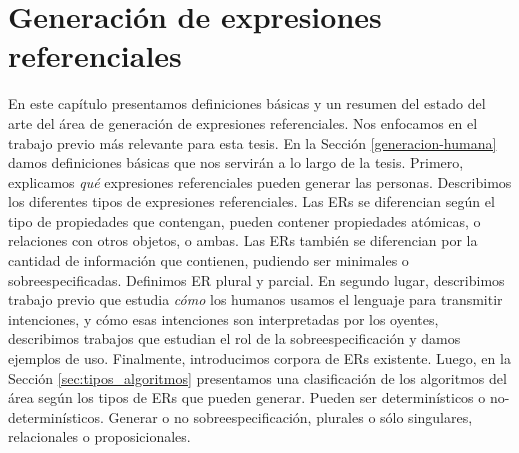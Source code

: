 \chapter{Generaci\'on de expresiones referenciales}
\label{sec:seleccion}

En este cap\'itulo presentamos definiciones b\'asicas y un resumen del estado del arte del \'area de generaci\'on de expresiones referenciales. Nos enfocamos en el trabajo previo m\'as relevante para esta tesis. 
En la Secci\'on \ref{generacion-humana} damos definiciones b\'asicas que nos servir\'an a 
lo largo de la tesis. Primero, explicamos \emph{qu\'e} expresiones referenciales pueden generar las personas. Describimos los diferentes tipos de expresiones referenciales. Las ERs se diferencian seg\'un el tipo de propiedades que 
contengan, pueden contener propiedades at\'omicas, o relaciones con otros objetos, o ambas. Las ERs tambi\'en se diferencian por la cantidad de informaci\'on que contienen, pudiendo ser minimales o sobreespecificadas. Definimos ER plural y parcial. %
En segundo lugar, describimos trabajo previo que estudia \emph{c\'omo} los humanos usamos el lenguaje para transmitir intenciones, y c\'omo esas intenciones son interpretadas por los oyentes, describimos trabajos que estudian el rol de la sobreespecificaci\'on y damos ejemplos de uso. Finalmente, introducimos corpora de ERs existente. Luego, en la Secci\'on \ref{sec:tipos_algoritmos} presentamos una clasificaci\'on de los algoritmos del \'area seg\'un los tipos de ERs que pueden generar. Pueden ser determin\'isticos o no-determin\'isticos. Generar o no sobreespecificaci\'on, plurales o s\'olo singulares, relacionales o proposicionales.
